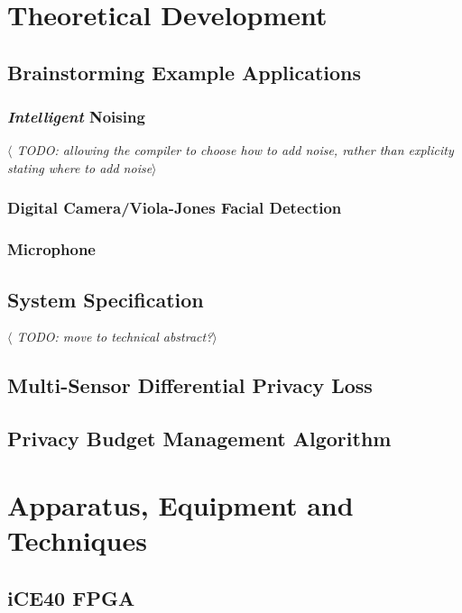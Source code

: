 \documentclass[12pt]{article}
\begin{document}
\section{Theoretical Development}

  \subsection{Brainstorming Example Applications}
    \subsubsection{\textit{Intelligent} Noising}
      \textit{$\langle$ TODO: allowing the compiler to choose how to add noise, rather than explicity stating where to add noise$\rangle$}

    \subsubsection{Digital Camera/Viola-Jones Facial Detection}

    \subsubsection{Microphone}


  \subsection{System Specification}
    \textit{$\langle$ TODO: move to technical abstract?$\rangle$}

  \subsection{Multi-Sensor Differential Privacy Loss}

  \subsection{Privacy Budget Management Algorithm}

\newpage



%
%

\section{Apparatus, Equipment and Techniques}

  \subsection{iCE40 FPGA}
\end{document}
